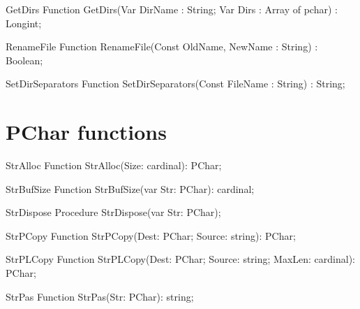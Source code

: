  
\begin{function}{GetDirs}
\Declaration
Function GetDirs(Var DirName : String; Var Dirs : Array of pchar) : Longint; 
\Description
\Errors
\SeeAlso
\end{function}

 
\begin{function}{RenameFile}
\Declaration
Function RenameFile(Const OldName, NewName : String) : Boolean;
\Description
\Errors
\SeeAlso
\end{function}

 
\begin{function}{SetDirSeparators}
\Declaration
Function SetDirSeparators(Const FileName : String) : String;
\Description
\Errors
\SeeAlso
\end{function}

 

\section{PChar functions}

\begin{function}{StrAlloc}
\Declaration
Function StrAlloc(Size: cardinal): PChar;
\Description
\Errors
\SeeAlso
\end{function}

 
\begin{function}{StrBufSize}
\Declaration
Function StrBufSize(var Str: PChar): cardinal;
\Description
\Errors
\SeeAlso
\end{function}

 
\begin{procedure}{StrDispose}
\Declaration
Procedure StrDispose(var Str: PChar);
\Description
\Errors
\SeeAlso
\end{procedure}

 
\begin{function}{StrPCopy}
\Declaration
Function StrPCopy(Dest: PChar; Source: string): PChar;
\Description
\Errors
\SeeAlso
\end{function}

 
\begin{function}{StrPLCopy}
\Declaration
Function StrPLCopy(Dest: PChar; Source: string; MaxLen: cardinal): PChar;
\Description
\Errors
\SeeAlso
\end{function}

 
\begin{function}{StrPas}
\Declaration
Function StrPas(Str: PChar): string;
\Description
\Errors
\SeeAlso
\end{function}

